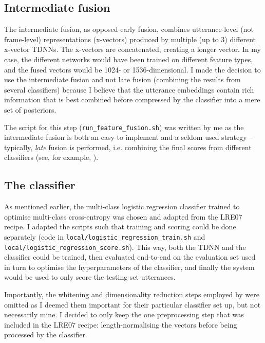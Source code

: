 \documentclass[bsc,frontabs,twoside,singlespacing,parskip,deptreport]{infthesis}
\begin{document}
{{    \subsection{Intermediate fusion}{
      \label{sec:intermediate-fusion}
      The intermediate fusion, as opposed early fusion, combines utterance-level (not frame-level) representations (x-vectors) produced by multiple (up to 3) different x-vector TDNNs. The x-vectors are concatenated, creating a longer vector. In my case, the different networks would have been trained on different feature types, and the fused vectors would be 1024- or 1536-dimensional. I made the decision to use the intermediate fusion and not late fusion (combining the results from several classifiers) because I believe that the utterance embeddings contain rich information that is best combined before compressed by the classifier into a mere set of posteriors.

      The script for this step (\verb|run_feature_fusion.sh|) was written by me as the intermediate fusion is both an easy to implement and a seldom used strategy -- typically, \textit{late} fusion is performed, i.e. combining the final scores from different classifiers (see, for example, \citet{Snyder_et_al_2018,Martinez_et_al_2012}).
    }

    \subsection{The classifier}{
      \label{sec:classifier-description}

      As mentioned earlier, the multi-class logistic regression classifier trained to optimise multi-class cross-entropy was chosen and adapted from the LRE07 recipe. I adapted the scripts such that training and scoring could be done separately (code in \verb|local/logistic_regression_train.sh| and \verb|local/logistic_regression_score.sh|). This way, both the TDNN and the classifier could be trained, then evaluated end-to-end on the evaluation set used in turn to optimise the hyperparameters of the classifier, and finally the system would be used to only score the testing set utterances.

      Importantly, the whitening and dimensionality reduction steps employed by \citet{Snyder_et_al_2018} were omitted as I deemed them important for their particular classifier set up, but not necessarily mine. I decided to only keep the one preprocessing step that was included in the LRE07 recipe: length-normalising the vectors before being processed by the classifier.

}}}
\end{document}

